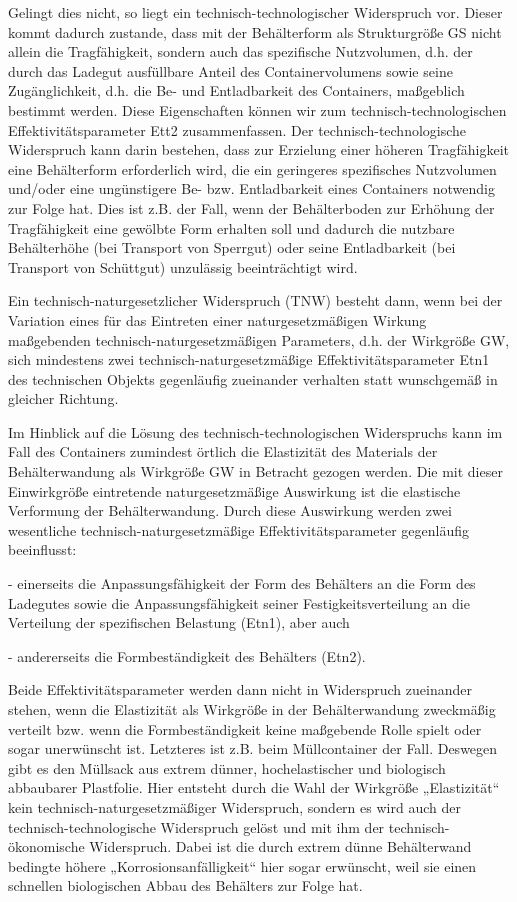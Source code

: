 \documentclass[12pt,a4paper]{article}
\begin{document}
Gelingt dies nicht, so liegt ein technisch-technologischer Widerspruch vor. Dieser kommt dadurch zustande, dass mit der Behälterform als Strukturgröße GS nicht allein die Tragfähigkeit, sondern auch das spezifische Nutzvolumen, d.h. der durch das Ladegut ausfüllbare Anteil des Containervolumens sowie seine Zugänglichkeit, d.h. die Be- und Entladbarkeit des Containers, maßgeblich bestimmt werden. Diese Eigenschaften können wir zum technisch-technologischen Effektivitätsparameter Ett2 zusammenfassen. Der technisch-technologische Widerspruch kann darin bestehen, dass zur Erzielung einer höheren Tragfähigkeit eine Behälterform erforderlich wird, die ein geringeres spezifisches Nutzvolumen und/oder eine ungünstigere Be- bzw. Entladbarkeit eines Containers notwendig zur Folge hat. Dies ist z.B. der Fall, wenn der Behälterboden zur Erhöhung der Tragfähigkeit eine gewölbte Form erhalten soll und dadurch die nutzbare Behälterhöhe (bei Transport von Sperrgut) oder seine Entladbarkeit (bei Transport von Schüttgut) unzulässig beeinträchtigt wird.

Ein technisch-naturgesetzlicher Widerspruch (TNW) besteht dann, wenn bei der Variation eines für das Eintreten einer naturgesetzmäßigen Wirkung maßgebenden technisch-naturgesetzmäßigen Parameters, d.h. der Wirkgröße GW, sich mindestens zwei technisch-naturgesetzmäßige Effektivitätsparameter Etn1 des technischen Objekts gegenläufig zueinander verhalten statt wunschgemäß in gleicher Richtung.

Im Hinblick auf die Lösung des technisch-technologischen Widerspruchs kann im Fall des Containers zumindest örtlich die Elastizität des Materials der Behälterwandung als Wirkgröße GW in Betracht gezogen werden. Die mit dieser Einwirkgröße eintretende naturgesetzmäßige Auswirkung ist die elastische Verformung der Behälterwandung. Durch diese Auswirkung werden zwei wesentliche technisch-naturgesetzmäßige Effektivitätsparameter gegenläufig beeinflusst:

- einerseits die Anpassungsfähigkeit der Form des Behälters an die Form des Ladegutes sowie die Anpassungsfähigkeit seiner Festigkeitsverteilung an die Verteilung der spezifischen Belastung (Etn1), aber auch

- andererseits die Formbeständigkeit des Behälters (Etn2).

Beide Effektivitätsparameter werden dann nicht in Widerspruch zueinander stehen, wenn die Elastizität als Wirkgröße in der Behälterwandung zweckmäßig verteilt bzw. wenn die Formbeständigkeit keine maßgebende Rolle spielt oder sogar unerwünscht ist. Letzteres ist z.B. beim Müllcontainer der Fall. Deswegen gibt es den Müllsack aus extrem dünner, hochelastischer und biologisch abbaubarer Plastfolie. Hier entsteht durch die Wahl der Wirkgröße „Elastizität“ kein technisch-naturgesetzmäßiger Widerspruch, sondern es wird auch der technisch-technologische Widerspruch gelöst und mit ihm der technisch-ökonomische Widerspruch. Dabei ist die durch extrem dünne Behälterwand bedingte höhere „Korrosionsanfälligkeit“ hier sogar erwünscht, weil sie einen schnellen biologischen Abbau des Behälters zur Folge hat.
\end{document}
